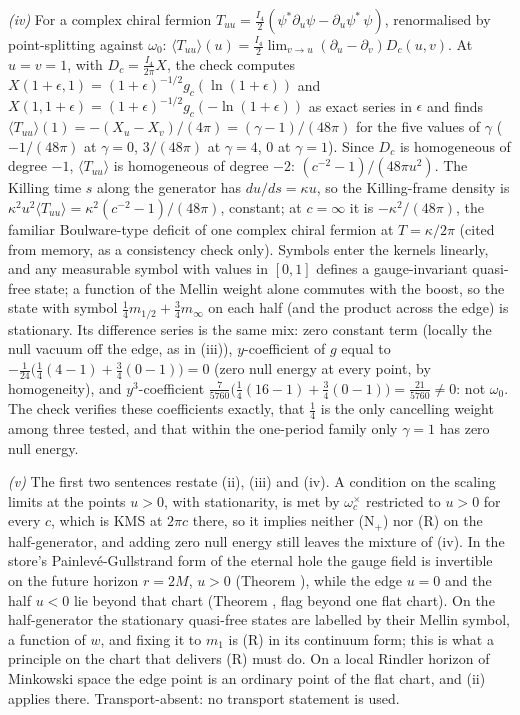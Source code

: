 \emph{(iv)} For a complex chiral fermion $T_{uu} = \tfrac{I_{4}}{2}(\psi^{*}\partial_{u}\psi - \partial_{u}\psi^{*}\,\psi)$, renormalised by point-splitting against $\omega_{0}$: $\langle T_{uu}\rangle(u) = \tfrac{I_{4}}{2}\lim_{v \to u}(\partial_{u} - \partial_{v})D_{c}(u, v)$. At $u = v = 1$, with $D_{c} = \tfrac{I_{4}}{2\pi}X$, the check computes $X(1 + \epsilon, 1) = (1 + \epsilon)^{-1/2}g_{c}(\ln(1 + \epsilon))$ and $X(1, 1 + \epsilon) = (1 + \epsilon)^{-1/2}g_{c}(-\ln(1 + \epsilon))$ as exact series in $\epsilon$ and finds $\langle T_{uu}\rangle(1) = -(X_{u} - X_{v})/(4\pi) = (\gamma - 1)/(48\pi)$ for the five values of $\gamma$ ($-1/(48\pi)$ at $\gamma = 0$, $3/(48\pi)$ at $\gamma = 4$, $0$ at $\gamma = 1$). Since $D_{c}$ is homogeneous of degree $-1$, $\langle T_{uu}\rangle$ is homogeneous of degree $-2$: $(c^{-2} - 1)/(48\pi u^{2})$. The Killing time $s$ along the generator has $du/ds = \kappa u$, so the Killing-frame density is $\kappa^{2}u^{2}\langle T_{uu}\rangle = \kappa^{2}(c^{-2} - 1)/(48\pi)$, constant; at $c = \infty$ it is $-\kappa^{2}/(48\pi)$, the familiar Boulware-type deficit of one complex chiral fermion at $T = \kappa/2\pi$ (cited from memory, as a consistency check only). Symbols enter the kernels linearly, and any measurable symbol with values in $[0, 1]$ defines a gauge-invariant quasi-free state; a function of the Mellin weight alone commutes with the boost, so the state with symbol $\tfrac14 m_{1/2} + \tfrac34 m_{\infty}$ on each half (and the product across the edge) is stationary. Its difference series is the same mix: zero constant term (locally the null vacuum off the edge, as in (iii)), $y$-coefficient of $g$ equal to $-\tfrac{1}{24}\big(\tfrac14(4 - 1) + \tfrac34(0 - 1)\big) = 0$ (zero null energy at every point, by homogeneity), and $y^{3}$-coefficient $\tfrac{7}{5760}\big(\tfrac14(16 - 1) + \tfrac34(0 - 1)\big) = \tfrac{21}{5760} \neq 0$: not $\omega_{0}$. The check verifies these coefficients exactly, that $\tfrac14$ is the only cancelling weight among three tested, and that within the one-period family only $\gamma = 1$ has zero null energy.

\emph{(v)} The first two sentences restate (ii), (iii) and (iv). A condition on the scaling limits at the points $u > 0$, with stationarity, is met by $\omega_{c}^{\times}$ restricted to $u > 0$ for every $c$, which is KMS at $2\pi c$ there, so it implies neither (N$_{+}$) nor (R) on the half-generator, and adding zero null energy still leaves the mixture of (iv). In the store's Painlev\'e-Gullstrand form of the eternal hole the gauge field is invertible on the future horizon $r = 2M$, $u > 0$ (Theorem ), while the edge $u = 0$ and the half $u < 0$ lie beyond that chart (Theorem , flag beyond one flat chart). On the half-generator the stationary quasi-free states are labelled by their Mellin symbol, a function of $w$, and fixing it to $m_{1}$ is (R) in its continuum form; this is what a principle on the chart that delivers (R) must do. On a local Rindler horizon of Minkowski space the edge point is an ordinary point of the flat chart, and (ii) applies there. Transport-absent: no transport statement is used.

